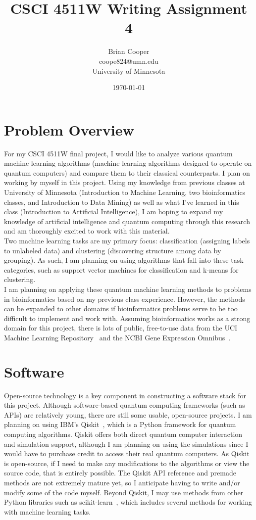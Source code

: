 \documentclass{article}
\title{CSCI 4511W Writing Assignment 4}
\author{Brian Cooper \\ coope824@umn.edu \\ University of Minnesota}
\date{\today}
\begin{document}
\maketitle

\section{Problem Overview}
  For my CSCI 4511W final project, I would like to analyze various quantum machine learning algorithms (machine learning algorithms designed to operate on quantum computers) and compare them to their classical counterparts. I plan on working by myself in this project. Using my knowledge from previous classes at University of Minnesota (Introduction to Machine Learning, two bioinformatics classes, and Introduction to Data Mining) as well as what I've learned in this class (Introduction to Artificial Intelligence), I am hoping to expand my knowledge of artificial intelligence and quantum computing through this research and am thoroughly excited to work with this material. \\

  Two machine learning tasks are my primary focus: classification (assigning labels to unlabeled data) and clustering (discovering structure among data by grouping). As such, I am planning on using algorithms that fall into these task categories, such as support vector machines for classification and k-means for clustering. \\

  I am planning on applying these quantum machine learning methods to problems in bioinformatics based on my previous class experience. However, the methods can be expanded to other domains if bioinformatics problems serve to be too difficult to implement and work with. Assuming bioinformatics works as a strong domain for this project, there is lots of public, free-to-use data from the UCI Machine Learning Repository~\cite{dua} and the NCBI Gene Expression Omnibus~\cite{edgar}.

\section{Software}
  Open-source technology is a key component in constructing a software stack for this project. Although software-based quantum computing frameworks (such as APIs) are relatively young, there are still some usable, open-source projects. I am planning on using IBM's Qiskit~\cite{qiskit}, which is a Python framework for quantum computing algorithms. Qiskit offers both direct quantum computer interaction and simulation support, although I am planning on using the simulations since I would have to purchase credit to access their real quantum computers. As Qiskit is open-source, if I need to make any modifications to the algorithms or view the source code, that is entirely possible. The Qiskit API reference and premade methods are not extremely mature yet, so I anticipate having to write and/or modify some of the code myself. Beyond Qiskit, I may use methods from other Python libraries such as scikit-learn~\cite{sklearn}, which includes several methods for working with machine learning tasks.
\end{document}
